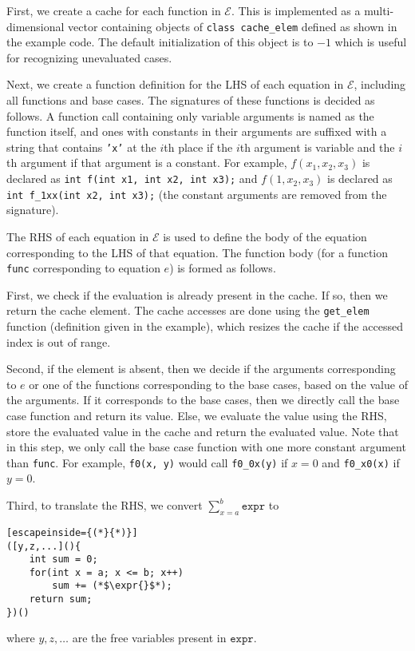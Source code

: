 \documentclass{article}
\theoremstyle{definition}
\newcommand{\expr}{\mathtt{expr}}
\begin{document}
First, we create a cache for each function in $\mathcal{E}$. This is implemented
as a multi-dimensional vector containing objects of \texttt{class cache\_elem}
defined as shown in the example code. The default initialization of this object
is to $-1$ which is useful for recognizing unevaluated cases.

Next, we create a function definition for the LHS of each equation in
$\mathcal{E}$, including all functions and base cases. The signatures of these
functions is decided as follows. A function call containing only variable
arguments is named as the function itself, and ones with constants in their
arguments are suffixed with a string that contains \texttt{'x'} at the $i$th
place if the $i$th argument is variable and the $i$th argument if that argument
is a constant. For example, $f(x_{1}, x_{2}, x_{3})$ is declared as \texttt{int
  f(int x1, int x2, int x3);} and $f(1, x_{2}, x_{3})$ is declared as
\texttt{int f\_1xx(int x2, int x3);} (the constant arguments are removed from
the signature).

The RHS of each equation in $\mathcal{E}$ is used to define the body of the
equation corresponding to the LHS of that equation. The function body (for a
function \texttt{func} corresponding to equation $e$) is formed as follows.

First, we check if the evaluation is already present in the cache. If so, then
we return the cache element. The cache accesses are done using the
\texttt{get\_elem} function (definition given in the example), which resizes the
cache if the accessed index is out of range.

Second, if the element is absent, then we decide if the arguments corresponding
to $e$ or one of the functions corresponding to the base cases, based on the
value of the arguments. If it corresponds to the base cases, then we directly
call the base case function and return its value. Else, we evaluate the value
using the RHS, store the evaluated value in the cache and return the evaluated
value. Note that in this step, we only call the base case function with one more
constant argument than \texttt{func}. For example, \texttt{f0(x, y)} would call
\texttt{f0\_0x(y)} if $x = 0$ and \texttt{f0\_x0(x)} if $y = 0$.

Third, to translate the RHS, we convert $\sum_{x=a}^{b} \expr{}$ to
\begin{lstlisting}[escapeinside={(*}{*)}]
([y,z,...](){
    int sum = 0;
    for(int x = a; x <= b; x++)
        sum += (*$\expr{}$*);
    return sum;
})()
\end{lstlisting}
where $y, z, \dots$ are the free variables present in $\expr{}$.
\end{document}
